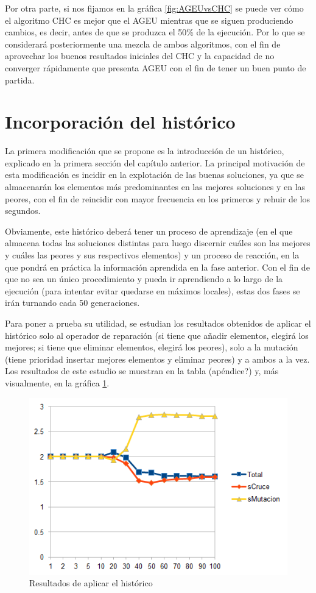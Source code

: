 Por otra parte, si nos fijamos en la gráfica \ref{fig:AGEUvsCHC} se puede ver cómo el algoritmo CHC es mejor que el AGEU mientras que se siguen produciendo cambios, es decir, antes de que se produzca el 50\% de la ejecución. 
Por lo que se considerará posteriormente una mezcla de ambos algoritmos, con el fin de aprovechar los buenos resultados iniciales del CHC y la capacidad de no converger rápidamente que presenta AGEU con el fin de tener un buen punto de partida.

\section{Incorporación del histórico}

La primera modificación que se propone es la introducción de un histórico, explicado en la primera sección del capítulo anterior. 
La principal motivación de esta modificación es incidir en la explotación de las buenas soluciones, ya que se almacenarán los elementos más predominantes en las mejores soluciones y en las peores, con el fin de reincidir con mayor frecuencia en los primeros y rehuir de los segundos. 

Obviamente, este histórico deberá tener un proceso de aprendizaje (en el que almacena todas las soluciones distintas para luego discernir cuáles son las mejores y cuáles las peores y sus respectivos elementos) y un proceso de reacción, en la que pondrá en práctica la información aprendida en la fase anterior. 
Con el fin de que no sea un único procedimiento y pueda ir aprendiendo a lo largo de la ejecución (para intentar evitar quedarse en máximos locales), estas dos fases se irán turnando cada 50 generaciones. 

Para poner a prueba su utilidad, se estudian los resultados obtenidos de aplicar el histórico solo al operador de reparación (si tiene que añadir elementos, elegirá los mejores; si tiene que eliminar elementos, elegirá los peores), solo a la mutación (tiene prioridad insertar mejores elementos y eliminar peores) y a ambos a la vez. 
Los resultados de este estudio se muestran en la tabla (apéndice?) y, más visualmente, en la gráfica \ref{fig:Historico}.

\begin{figure}[h]
		\centering
		\includegraphics[scale=1]{imagenes/Experimental/Historico.png}
        \caption{Resultados de aplicar el histórico}
        \label{fig:Historico}
\end{figure}

